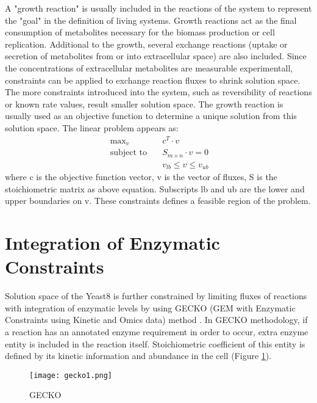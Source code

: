 A "growth reaction" is usually included in the reactions of the system to represent the "goal" in the definition of living systems. Growth reactions act as the final consumption of metabolites necessary for the biomass production or cell replication. Additional to the growth, several exchange reactions (uptake or secretion of metabolites from or into extracellular space) are also included. Since the concentrations of extracellular metabolites are measurable experimentall, constraints can be applied to exchange reaction fluxes to shrink solution space. The more constraints introduced into the system, such as reversibility of reactions or known rate values, result smaller solution space. The growth reaction is usually used as an objective function to determine a unique solution from this solution space. The linear problem appears as:
\begin{align}
 \ \text{max}_v \quad & c^T \cdot v \\
 \label{eq:fba}
 \ \text{subject to} \quad & S_{m \times n} \cdot v=0 \\
 \ & v_{lb} \leq v \leq v_{ub}
\end{align}
\noindent where c is the objective function vector, v is the vector of fluxes, S is the stoichiometric matrix as above equation. Subscripts lb and ub are the lower and upper boundaries on v. These constraints defines a feasible region of the problem.

\section{Integration of Enzymatic Constraints}

Solution space of the Yeast8 is further constrained by limiting fluxes of reactions with integration of enzymatic levels by using GECKO (GEM with Enzymatic Constraints using Kinetic and Omics data) method \cite{sanchez2017improving}. In GECKO methodology, if a reaction has an annotated enzyme requirement in order to occur, extra enzyme entity is included in the reaction itself. Stoichiometric coefficient of this entity is defined by its kinetic information and abundance in the cell (Figure \ref{fig:gecko1}).

\begin{figure}[H]
\begin{center}
\texttt{[image: gecko1.png]}
\end{center}
\caption[GECKO]{GECKO}
\label{fig:gecko1}
\end{figure}

